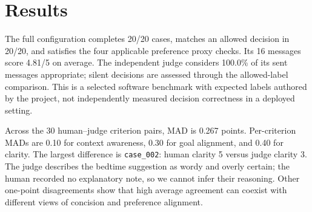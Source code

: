 \documentclass{article}
\begin{document}
\section{Results}
\begin{table}[t]
\caption{Full-system results by case category. Decisions are compared with manually specified allowed labels. Quality uses only non-null messages.}
\centering\resizebox{\textwidth}{!}{}
\end{table}
\begin{table}[t]
\caption{Required controlled comparisons. Each row has 20 cases. Preference adherence is a four-case lexical/theme/length proxy, not a semantic or clinical outcome. Quality means may have different non-null cohorts; paired comparisons appear below.}
\centering\resizebox{\textwidth}{!}{}
\end{table}
\begin{table}[t]
\caption{Human versus automated ratings on the same 10 messages. The mean-score row averages criteria within each message; its MAD can be smaller than criterion-level MAD.}
\centering\resizebox{\textwidth}{!}{}
\end{table}

The full configuration completes 20/20 cases, matches an allowed decision in 20/20, and satisfies the four applicable preference proxy checks. Its 16 messages score 4.81/5 on average. The independent judge considers 100.0\% of its sent messages appropriate; silent decisions are assessed through the allowed-label comparison. This is a selected software benchmark with expected labels authored by the project, not independently measured decision correctness in a deployed setting.

Across the 30 human--judge criterion pairs, MAD is 0.267 points. Per-criterion MADs are 0.10 for context awareness, 0.30 for goal alignment, and 0.40 for clarity. The largest difference is \texttt{case\_002}: human clarity 5 versus judge clarity 3. The judge describes the bedtime suggestion as wordy and overly certain; the human recorded no explanatory note, so we cannot infer their reasoning. Other one-point disagreements show that high average agreement can coexist with different views of concision and preference alignment.
\end{document}
